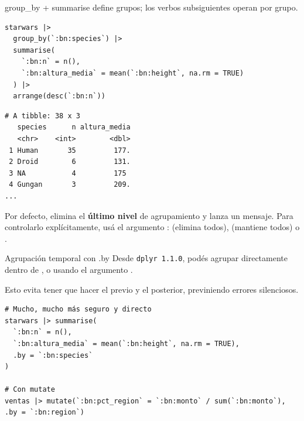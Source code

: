 \documentclass[8pt]{beamer}
\begin{document}
\begin{frame}[fragile]{group\_by + summarise}
	 define grupos; los verbos subsiguientes operan por grupo.
\begin{lstlisting}[style=RScript]
starwars |>
  group_by(`:bn:species`) |>
  summarise(
    `:bn:n` = n(),
    `:bn:altura_media` = mean(`:bn:height`, na.rm = TRUE)
  ) |>
  arrange(desc(`:bn:n`))
\end{lstlisting}
\begin{lstlisting}[style=RConsole]
# A tibble: 38 x 3
   species      n altura_media
   <chr>    <int>        <dbl>
 1 Human       35         177.
 2 Droid        6         131.
 3 NA           4         175 
 4 Gungan       3         209.
...
\end{lstlisting}

	\begin{alertblock}{}
		Por defecto,  elimina el \textbf{último nivel} de agrupamiento y lanza un mensaje. Para controlarlo explícitamente, usá el argumento :  (elimina todos),  (mantiene todos) o .
	\end{alertblock}
\end{frame}




\begin{frame}[fragile]{Agrupación temporal con .by}
	Desde \texttt{dplyr 1.1.0}, podés agrupar directamente dentro de ,  o  usando el argumento .
	
	Esto evita tener que hacer el  previo y el  posterior, previniendo errores silenciosos.
\begin{lstlisting}[style=RScript]
# Mucho, mucho más seguro y directo
starwars |> summarise(
  `:bn:n` = n(),
  `:bn:altura_media` = mean(`:bn:height`, na.rm = TRUE),
  .by = `:bn:species`
)

# Con mutate
ventas |> mutate(`:bn:pct_region` = `:bn:monto` / sum(`:bn:monto`), .by = `:bn:region`)
\end{lstlisting}
\end{frame}
\end{document}
